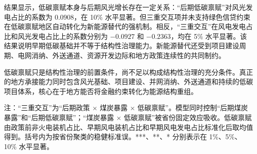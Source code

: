 \documentclass[UTF8,12pt]{ctexart}
\begin{document}
结果显示，低碳禀赋本身与后期风光增长存在一定关系：“后期低碳禀赋”对风光发电占比的系数为 $0.0908$，在 10\% 水平显著。但三重交互项并未支持绿色信贷约束在低碳禀赋地区自动转化为新能源替代的强机制。相反，“三重交互”在风电发电占比和风光发电占比上的系数分别为 $-0.0927$ 和 $-0.2363$，均在 5\% 水平显著。该结果说明早期低碳基础并不等于结构性治理能力。新能源替代还受到项目建设周期、电网消纳、外送通道、资源开发边际和地方政策连续性的共同制约。

低碳禀赋只是结构性治理的前置条件，尚不足以构成结构性治理的充分条件。真正的地方承接能力同时包含风光基础、项目建设、并网消纳、外送通道和持续的低碳项目体系，核心在于地方能否将金融约束转化为能源结构重组。

\begin{table}[htbp]
    \centering
    \caption{结构性治理的条件：低碳禀赋、时间错位与新能源替代}
    \label{tab:lowcarbon}
    \begin{flushleft}
    \footnotesize 注：“三重交互”为“后期政策 $\times$ 煤炭暴露 $\times$ 低碳禀赋”。模型同时控制“后期煤炭暴露”和“后期低碳禀赋”；“煤炭暴露 $\times$ 低碳禀赋”被省份固定效应吸收。低碳禀赋由政策前非火电装机占比、早期风电装机占比和早期风电发电占比标准化后取均值得到。括号内为按省份聚类的稳健标准误。***、**、* 分别表示在 1\%、5\%、10\% 水平显著。
    \end{flushleft}
\end{table}
\end{document}
